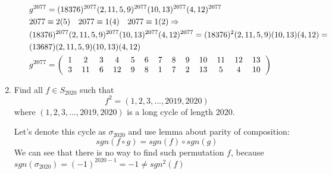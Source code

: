 \documentclass{article}
\begin{document}
\begin{enumerate}
\begin{enumerate}
\begin{align*}
&g^{2077} = (18376)^{2077}(2,11,5,9)^{2077}(10,13)^{2077}(4,12)^{2077}\\
&2077\equiv2 (5) \quad 2077\equiv1 (4) \quad 2077\equiv1 (2) \Rightarrow\\
&(18376)^{2077}(2,11,5,9)^{2077}(10,13)^{2077}(4,12)^{2077} = (18376)^{2}(2,11,5,9)(10,13)(4,12)=\\
&(13687)(2,11,5,9)(10,13)(4,12)\\
&g^{2077} = \begin{pmatrix}
\begin{tabular}{ccccccccccccc}
1&2&3&4&5&6&7&8&9&10&11&12&13\\
3&11&6&12&9&8&1&7&2&13&5&4&10
\end{tabular}
\end{pmatrix}
\end{align*}

\end{enumerate}

\item Find all $f \in S_{2020}$ such that
\[f^2 = (1, 2, 3, ..., 2019, 2020)\]
where $(1, 2, 3, ..., 2019, 2020)$ is a long cycle of length 2020.

Let's denote this cycle as $\sigma_{2020}$ and use lemma about parity of composition: 
\[sgn(f \circ g) = sgn(f) \circ sgn(g)\]
We can see that there is no way to find such permutation $f$, because $sgn(\sigma_{2020}) = (-1)^{2020 - 1} = -1 \neq sgn^2(f)$

\end{enumerate}
\end{document}
